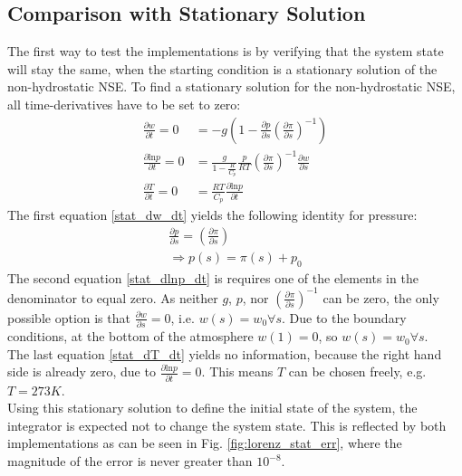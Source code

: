 \subsection{Comparison with Stationary Solution}
The first way to test the implementations is by verifying that the system state will stay the same, when the starting condition is a stationary solution of the non-hydrostatic NSE.
To find a stationary solution for the non-hydrostatic NSE, all time-derivatives have to be set to zero:
\begin{align}
\frac{\partial w}{\partial t} =0&= -g\left(1 - \frac{\partial p}{\partial s}\left(\frac{\partial \pi}{\partial s}\right)^{-1}\right)\label{stat_dw_dt} \\
\frac{\partial \text{ln}p}{\partial t}=0 &= \frac{g}{1- \frac{R}{C_p}} \frac{p}{RT}\left(\frac{\partial \pi}{\partial s}\right)^{-1} \frac{\partial w}{\partial s}\label{stat_dlnp_dt}\\
\frac{\partial T}{\partial t} =0&= \frac{RT}{C_p}\frac{\partial \text{ln}p}{\partial t}\label{stat_dT_dt}
\end{align}
The first equation \ref{stat_dw_dt} yields the following identity for pressure:
\begin{align*}
\frac{\partial p}{\partial s}=\left(\frac{\partial \pi}{\partial s}\right)\\
\Rightarrow p(s)=\pi (s) + p_0
\end{align*}
The second equation \ref{stat_dlnp_dt} is requires one of the elements in the denominator to equal zero.
As neither $g$, $p$, nor $\left(\frac{\partial \pi}{\partial s}\right)^{-1}$ can be zero, the only possible option is that $\frac{\partial w}{\partial s}=0$, i.e. $w(s)=w_0 \forall s$.
Due to the boundary conditions, at the bottom of the atmosphere $w(1)=0$, so $w(s)=w_0 \forall s$.\\
The last equation \ref{stat_dT_dt} yields no information, because the right hand side is already zero, due to $\frac{\partial \text{ln}p}{\partial t}=0$.
This means $T$ can be chosen freely, e.g. $T=273K$.\\
Using this stationary solution to define the initial state of the system, the integrator is expected not to change the system state.
This is reflected by both implementations as can be seen in Fig. \ref{fig:lorenz_stat_err}, where the magnitude of the error is never greater than $10^{-8}$.

